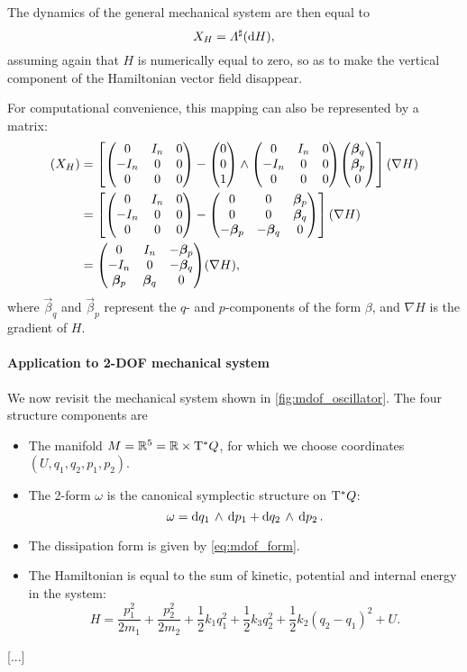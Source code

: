 The dynamics of the general mechanical system are then equal to 
$$ X_H = \Lambda^\sharp(\dd{H}), $$
assuming again that $H$ is numerically equal to zero, so as to make the vertical component of the Hamiltonian vector field disappear.

For computational convenience, this mapping can also be represented by a matrix: 
\begin{equation}
    \begin{split}
        (X_H) &= \qty[\mqty( 0 & I_n & 0 \\  -I_n & 0 & 0 \\ 0 & 0 & 0) 
                - \mqty(0 \\ 0 \\ 1) \wedge \mqty( 0 & I_n & 0 \\  -I_n & 0 & 0 \\ 0 & 0 & 0) \mqty(\vec{\beta}_{q} \\ \vec{\beta}_{p}\\0)](\nabla H) \\
              &= \qty[\mqty( 0 & I_n & 0 \\  -I_n & 0 & 0 \\ 0 & 0 & 0) 
                 - \mqty(0 & 0 & \vec{\beta}_p \\ 0 & 0 & \vec{\beta}_q \\ -\vec{\beta}_p &  -\vec{\beta}_q & 0 )](\nabla H) \\
              &= \mqty( 0 & I_n & -\vec{\beta}_p \\  -I_n & 0 & -\vec{\beta}_q \\ \vec{\beta}_p & \vec{\beta}_q & 0)(\nabla H),
    \end{split}
\end{equation}
where $\vec{\beta}_q$ and $\vec{\beta}_p$ represent the $q$- and $p$-components of the form $\beta$, and $\nabla H$ is the gradient of $H$.

\paragraph{Application to 2-DOF mechanical system}
We now revisit the mechanical system shown in \cref{fig:mdof_oscillator}. The four structure components are
\begin{itemize}
    \item The manifold $M = \mathbb{R}^5 = \mathbb{R} \times \mathrm{T}^*Q$, for which we choose coordinates $(U, q_1, q_2, p_1, p_2)$.
    \item The 2-form $\omega$ is the canonical symplectic structure on $\mathrm{T}^*Q$:
        $$ \omega =  \dd{q_1}\,\wedge\,\dd{p_1}  +  \dd{q_2}\,\wedge\,\dd{p_2} . $$
    \item The dissipation form is given by \cref{eq:mdof_form}.
    \item The Hamiltonian is equal to the sum of kinetic, potential and internal energy in the system:
        $$ H = \frac{p^2_1}{2m_1} + \frac{p^2_2}{2m_2} + \frac{1}{2}k_1q_1^2 + \frac{1}{2}k_3q_2^2 + \frac{1}{2}k_2(q_2 - q_1)^2 + U.$$
\end{itemize}

[...]
